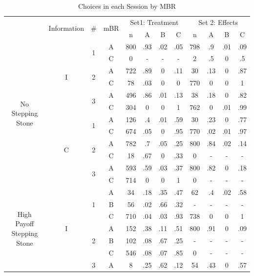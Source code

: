 \begin{table}[h]
\footnotesize
\centering
\caption{Choices in each Session by MBR}
\label{tab:choiceexperiment}
\begin{tabular}{ c c c c c c c c c c c c} 
\Xhline{.1em}
\multirow{2}{8em}{Game} & \multirow{2}{5em}{Information} & \multirow{2}{1em}{\#} & \multirow{2}{2em}{mBR} & \multicolumn{4}{c}{Set1: Treatment} & \multicolumn{4}{c}{Set 2: Effects}\\
& & & & n & A & B & C & n & A & B & C \\
\hline
\multirow{12}{8em}{No Stepping Stone} & \multirow{6}{0em}{I} & \multirow{2}{0em}{1} & A & 800 & .93 & .02 & .05 & 798 & .9 & .01 & .09 \\ 
& & & C & 0 & - & - & - & 2 & .5 & 0 & .5 \\
& & \multirow{2}{0em}{2} & A & 722 & .89 & 0 & .11 & 30 & .13 & 0 & .87 \\ 
& & & C & 78 & .03 & 0 & 0 & 770 & 0 & 0 & 1 \\
& & \multirow{2}{0em}{3} & A & 496 & .86 & .01 & .13 & 38 & .18 & 0 & .82 \\ 
& & & C & 304 & 0 & 0 & 1 & 762 & 0 & .01 & .99 \\
 & \multirow{6}{0em}{C} & \multirow{2}{0em}{1} & A & 126 & .4 & .01 & .59 & 30 & .23 & 0 & .77 \\ 
& & & C & 674 & .05 & 0 & .95 & 770 & .02 & .01 & .97 \\ 
& & \multirow{2}{0em}{2} & A & 782 & .7 & .05 & .25 & 800 & .84 & .02 & .14 \\ 
& & & C & 18 & .67 & 0 & .33 & 0 & - & - & - \\
& & \multirow{2}{0em}{3} & A & 593 & .59 & .03 & .37 & 800 & .82 & 0 & .18 \\ 
& & & C & 714 & 0 & 0 & 1 & 0 & - & - & - \\
\multirow{18}{8em}{High Payoff Stepping Stone} & \multirow{9}{0em}{I} & \multirow{3}{0em}{1} & A & 34 & .18 & .35 & .47 & 62 & .4 & .02 & .58 \\ 
& & & B & 56 & .02 & .66 & .32 & - & - & - & - \\ 
& & & C & 710 & .04 & .03 & .93 & 738 & 0 & 0 & 1 \\
& & \multirow{3}{0em}{2} & A & 152 & .38 & .11 & .51 & 800 & .91 & 0 & .09 \\ 
& & & B & 102 & .08 & .67 & .25 & - & - & - & - \\ 
& & & C & 546 & .08 & .07 & .85 & 0 & - & - & - \\ 
& & \multirow{3}{0em}{3} & A & 8 & .25 & .62 & .12 & 54 & .43 & 0 & .57 \\ 

\end{tabular}
\end{table}
